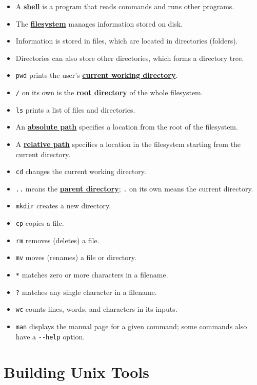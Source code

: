 \documentclass[
]{krantz}
\providecommand{\tightlist}{%
  \setlength{\itemsep}{0pt}\setlength{\parskip}{0pt}}
\newcommand{\gref}[2]{\hyperlink{#2}{\textbf{#1}}}
\begin{document}
\begin{itemize}
\tightlist
\item
  A \gref{shell}{shell} is a program that reads commands and runs other programs.
\item
  The \gref{filesystem}{filesystem} manages information stored on disk.
\item
  Information is stored in files, which are located in directories (folders).
\item
  Directories can also store other directories, which forms a directory tree.
\item
  \texttt{pwd} prints the user's \gref{current working directory}{current\_working\_directory}.
\item
  \texttt{/} on its own is the \gref{root directory}{root\_directory} of the whole filesystem.
\item
  \texttt{ls} prints a list of files and directories.
\item
  An \gref{absolute path}{absolute\_path} specifies a location from the root of the filesystem.
\item
  A \gref{relative path}{relative\_path} specifies a location in the filesystem starting from the current directory.
\item
  \texttt{cd} changes the current working directory.
\item
  \texttt{..} means the \gref{parent directory}{parent\_directory}; \texttt{.} on its own means the current directory.
\item
  \texttt{mkdir} creates a new directory.
\item
  \texttt{cp} copies a file.
\item
  \texttt{rm} removes (deletes) a file.
\item
  \texttt{mv} moves (renames) a file or directory.
\item
  \texttt{*} matches zero or more characters in a filename.
\item
  \texttt{?} matches any single character in a filename.
\item
  \texttt{wc} counts lines, words, and characters in its inputs.
\item
  \texttt{man} displays the manual page for a given command; some commands also have a \texttt{-\/-help} option.
\end{itemize}

\hypertarget{bash-tools}{%
\chapter{Building Unix Tools}\label{bash-tools}}
\end{document}
